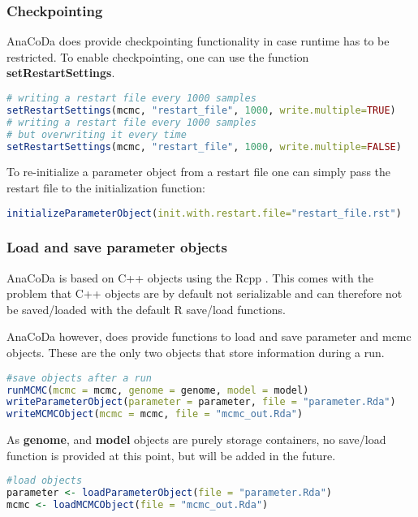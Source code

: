 \subsubsection{Checkpointing}

AnaCoDa does provide checkpointing functionality in case runtime has to be restricted. 
To enable checkpointing, one can use the function \textbf{setRestartSettings}.

\begin{lstlisting}[language=R]
# writing a restart file every 1000 samples
setRestartSettings(mcmc, "restart_file", 1000, write.multiple=TRUE)
# writing a restart file every 1000 samples 
# but overwriting it every time
setRestartSettings(mcmc, "restart_file", 1000, write.multiple=FALSE)
\end{lstlisting}

To re-initialize a parameter object from a restart file one can simply pass the restart file to the initialization function:

\begin{lstlisting}[language=R]
initializeParameterObject(init.with.restart.file="restart_file.rst")
\end{lstlisting}

\subsubsection{Load and save parameter objects}
AnaCoDa is based on C++ objects using the Rcpp \citep{rcpp_package}. 
This comes with the problem that C++ objects are by default not serializable and can therefore not be saved/loaded with the default R save/load functions.

AnaCoDa however, does provide functions to load and save parameter and mcmc objects. 
These are the only two objects that store information during a run.

\begin{lstlisting}[language=R]
#save objects after a run
runMCMC(mcmc = mcmc, genome = genome, model = model)
writeParameterObject(parameter = parameter, file = "parameter.Rda")
writeMCMCObject(mcmc = mcmc, file = "mcmc_out.Rda")
\end{lstlisting}

As \textbf{genome}, and \textbf{model} objects are purely storage containers, no save/load function is provided at this point, but will be added in the future.

\begin{lstlisting}[language=R]
#load objects
parameter <- loadParameterObject(file = "parameter.Rda")
mcmc <- loadMCMCObject(file = "mcmc_out.Rda")
\end{lstlisting}

